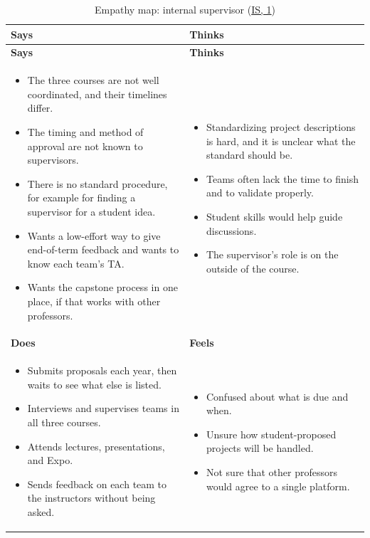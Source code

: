 \documentclass{article}
\newcommand{\intlink}[3]{\hyperref[int:#1-#2]{#3}}
\newcommand{\intref}[2]{\intlink{#1}{#2}{#1, #2}}
\newcommand{\empathymap}[6]{%
    \begin{longtable}{|p{0.465\textwidth}|p{0.465\textwidth}|}
    \caption{#1}\label{#2}\\
    \hline
    \textbf{Says} & \textbf{Thinks}\\ \hline
    \endfirsthead
    \hline
    \textbf{Says} & \textbf{Thinks}\\ \hline
    \endhead
    #3 & #4 \\ \hline
    \textbf{Does} & \textbf{Feels}\\ \hline
    #5 & #6 \\ \hline
    \end{longtable}}
\begin{document}
    \empathymap{Empathy map: internal supervisor (\intref{IS}{1})}{tab:map-is}
    {\begin{itemize}
         \item The three courses are not well coordinated, and their timelines differ.
         \item The timing and method of approval are not known to supervisors.
         \item There is no standard procedure, for example for finding a supervisor for a student idea.
         \item Wants a low-effort way to give end-of-term feedback and wants to know each team's TA.
         \item Wants the capstone process in one place, if that works with other professors.
    \end{itemize}}
    {\begin{itemize}
         \item Standardizing project descriptions is hard, and it is unclear what the standard should be.
         \item Teams often lack the time to finish and to validate properly.
         \item Student skills would help guide discussions.
         \item The supervisor's role is on the outside of the course.
    \end{itemize}}
    {\begin{itemize}
         \item Submits proposals each year, then waits to see what else is listed.
         \item Interviews and supervises teams in all three courses.
         \item Attends lectures, presentations, and Expo.
         \item Sends feedback on each team to the instructors without being asked.
    \end{itemize}}
    {\begin{itemize}
         \item Confused about what is due and when.
         \item Unsure how student-proposed projects will be handled.
         \item Not sure that other professors would agree to a single platform.
    \end{itemize}}
\end{document}
